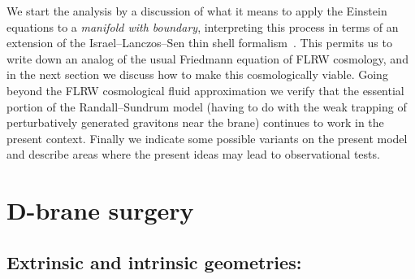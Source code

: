 \documentclass[a4paper,12pt]{article}
\begin{document}
We start the analysis by a discussion of what it means to apply the
Einstein equations to a {\em manifold with boundary}, interpreting
this process in terms of an extension of the Israel--Lanczos--Sen thin
shell formalism~\cite{Israel,Lanczos,Sen}. This permits us to write
down an analog of the usual Friedmann equation of FLRW cosmology, and
in the next section we discuss how to make this cosmologically
viable. Going beyond the FLRW cosmological fluid approximation we
verify that the essential portion of the Randall--Sundrum model
(having to do with the weak trapping of perturbatively generated
gravitons near the brane) continues to work in the present
context. Finally we indicate some possible variants on the present
model and describe areas where the present ideas may lead to
observational tests.




\section{D-brane surgery}
\label{S:surgery}
\subsection{Extrinsic and intrinsic geometries:}
\end{document}
